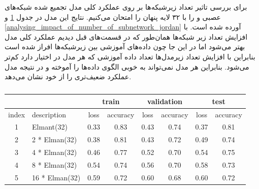 \documentclass[12pt, a4paper]{article}
\begin{document}
برای بررسی تاثیر تعداد زیرشبکه‌ها بر روی عملکرد کلی مدل تجمیع شده شبکه‌های عصبی  و  را
با ۳۲ لایه پنهان را امتحان می‌کنیم. نتایج این مدل در جدول \ref{analysing_impact_of_number_of_subnetwork_elman}
و \ref{analysing_impact_of_number_of_subnetwork_jordan} آورده شده است. با افزایش تعداد زیر شبکه‌ها همان‌طور که
در قسمت‌های قبل دیدیم عملکرد کلی مدل بهتر می‌شود اما در این جا چون داده‌های آموزشی بین زیرشبکه‌ها افراز شده است
بنابراین با افزایش تعداد زیرمدل‌ها تعداد داده آموزشی که هر مدل در اختیار دارد کم‌تر می‌شود. بنابراین هر مدل
نمی‌تواند به خوبی الگوی داده‌ها را آموخته و در نتیجه مدل عملکرد ضعیف‌تری را از خود نشان می‌دهد.

\begin{latin}
\begin{table}[!ht]
    \centering
    \caption{}
    \label{analysing_impact_of_number_of_subnetwork_elman}
    \begin{tabular}{c|p{3cm}|c|c|c|c|c|c}
        & & \multicolumn{2}{c|}{\cellcolor{teal!30}train} & \multicolumn{2}{c|}{\cellcolor{teal!30}validation} &  \multicolumn{2}{c}{\cellcolor{teal!30}test} \\ \hline
        index & description & loss & accuracy & loss & accuracy & loss & accuracy\\ \hline
        1 & Elmant(32) & 0.33 & 0.83 & 0.43 & 0.74 & 0.37 & 0.81 \\
        2 & 2 * Elman(32) & 0.38 & 0.81 & 0.43 & 0.72 & 0.49 & 0.74 \\
        3 & 4 * Elman(32) & 0.46 & 0.77 & 0.52 & 0.70 & 0.54 & 0.75 \\
        4 & 8 * Elman(32) & 0.54 & 0.74 & 0.56 & 0.70 & 0.58 & 0.73 \\
        5 & 16 * Elman(32) & 0.59 & 0.72 & 0.60 & 0.68 & 0.60 & 0.72 \\
    \end{tabular}
\end{table}
\end{latin}

\clearpage
\end{document}
